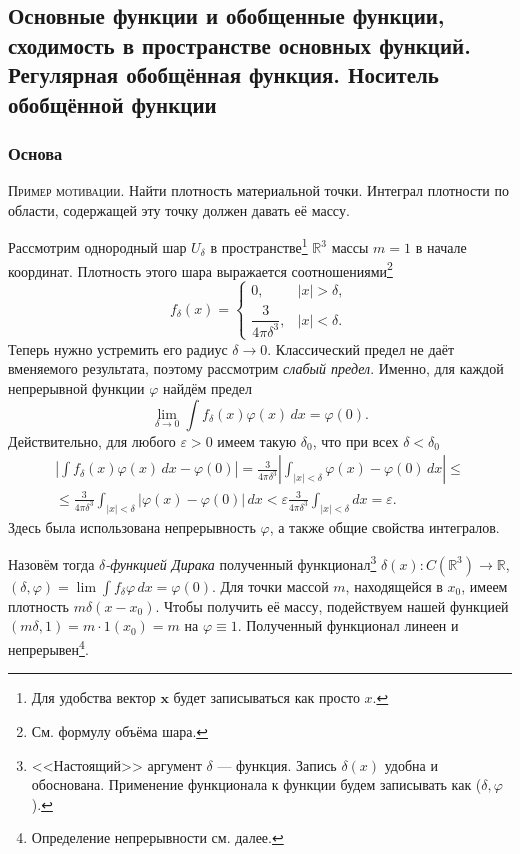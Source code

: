 \subsection{Основные функции и обобщенные функции, сходимость в пространстве основных функций. Регулярная обобщённая функция. Носитель обобщённой функции}
\subsubsection{Основа}
\textsc{Пример мотивации.} Найти плотность материальной точки. Интеграл
плотности по
области, содержащей эту точку должен давать её массу.

Рассмотрим однородный шар $ U_\delta $ в пространстве\footnote{Для удобства
вектор $ \mathbf x $ будет записываться как просто $ x $.} $ \mathbb R^3 $ массы $ m = 1 $ в начале координат. Плотность этого шара выражается
соотношениями\footnote{См. формулу объёма шара.}  
\[
  f_\delta(x) = \begin{cases}
    0, & |x| > \delta,\\
    \dfrac{3}{4\pi \delta^3}, & |x| < \delta.
  \end{cases}
\]
Теперь нужно устремить его радиус $ \delta \to 0 $. Классический предел не
даёт вменяемого результата, поэтому рассмотрим \emph{слабый предел}. Именно, для
каждой непрерывной функции $ \varphi $ найдём предел 
\[
  \lim_{\delta \to 0} \int f_\delta(x)\varphi(x) \, dx = \varphi(0).
\]
Действительно, для любого $ \varepsilon > 0 $ имеем такую $ \delta_0 $, что при
всех $ \delta < \delta_0 $ 
\begin{multline*}
    \left| \int f_\delta(x)\varphi(x)\, dx - \varphi(0) \right| =
    \frac{3}{4\pi\delta^3} \left| \int_{|x| < \delta} \varphi(x) - \varphi(0)\,dx
    \right| \leqslant\\\leqslant
    \frac{3}{4\pi\delta^3} \int_{|x|<\delta}|\varphi(x)-\varphi(0)|\, dx <
    \varepsilon \frac{3}{4\pi\delta^3} \int_{|x| <\delta} dx = \varepsilon.
\end{multline*}
Здесь была использована непрерывность $ \varphi $, а также общие свойства
интегралов.

\sloppy
Назовём тогда \emph{$ \delta $-функцией Дирака} полученный
функционал\footnote{<<Настоящий>> аргумент $ \delta $ --- функция. Запись $
\delta(x) $ удобна и обоснована. Применение функционала к функции будем записывать как ($\delta,
\varphi  $).} $ \delta(x)\colon C(\mathbb R^3) \to \mathbb R $, $(\delta, \varphi) = \lim\int
f_\delta\varphi\,dx = \varphi(0)$. Для точки массой $ m $, находящейся в
$ x_0  $, имеем плотность $
m\delta(x - x_0) $. Чтобы получить её массу, подействуем нашей функцией $ (m\delta, 1)
= m\cdot1(x_0) = m$ на $ \varphi\equiv 1 $. Полученный функционал линеен и
непрерывен\footnote{Определение непрерывности см. далее.}. 

